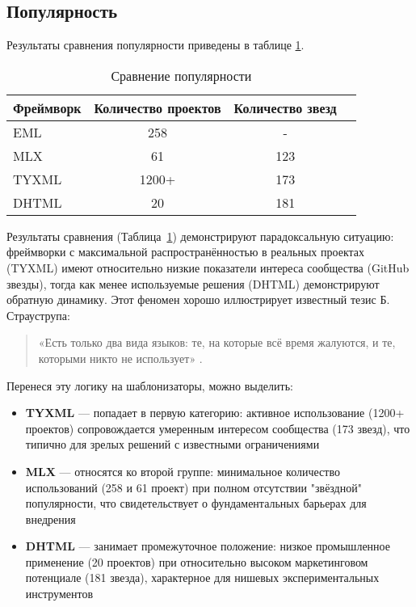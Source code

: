 \subsection{Популярность}

Результаты сравнения популярности приведены в таблице \ref{tab:popularity-comparison}.

\begin{table}[h!]
    \centering
    \begin{tabular}{lccc}
        \toprule
        \textbf{Фреймворк} & \textbf{Количество проектов} & \textbf{Количество звезд} \\
        \midrule
        EML & 258 & - \\
        MLX & 61 & 123 \\
        TYXML & 1200+ & 173 \\
        DHTML & 20 & 181 \\
        \bottomrule
    \end{tabular}
    \caption{Сравнение популярности}
    \label{tab:popularity-comparison}
\end{table}

Результаты сравнения (Таблица~\ref{tab:popularity-comparison}) демонстрируют парадоксальную ситуацию: фреймворки с максимальной распространённостью в реальных проектах (TYXML) имеют относительно низкие показатели интереса сообщества (GitHub звезды), тогда как менее используемые решения (DHTML) демонстрируют обратную динамику.
Этот феномен хорошо иллюстрирует известный тезис Б. Страуструпа:
\begin{quote}
    «Есть только два вида языков: те, на которые всё время жалуются, и те, которыми никто не использует» \cite{TwoKinds}.
\end{quote}

Перенеся эту логику на шаблонизаторы, можно выделить:
\begin{itemize}
    \item \textbf{TYXML} — попадает в первую категорию: активное использование (1200+ проектов) сопровождается умеренным интересом сообщества (173 звезд), что типично для зрелых решений с известными ограничениями
    \item \textbf{MLX} — относятся ко второй группе: минимальное количество использований (258 и 61 проект) при полном отсутствии "звёздной" популярности, что свидетельствует о фундаментальных барьерах для внедрения
    \item \textbf{DHTML} — занимает промежуточное положение: низкое промышленное применение (20 проектов) при относительно высоком маркетинговом потенциале (181 звезда), характерное для нишевых экспериментальных инструментов
\end{itemize}

